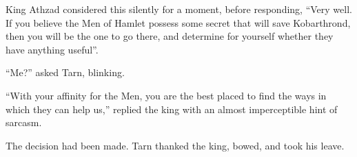 King Athzad considered this silently for a moment, before responding, ``Very well.  If you believe the Men of Hamlet possess some secret that will save Kobarthrond, then you will be the one to go there, and determine for yourself whether they have anything useful''.

``Me?'' asked Tarn, blinking.

``With your affinity for the Men, you are the best placed to find the ways in which they can help us,'' replied the king with an almost imperceptible hint of sarcasm.

The decision had been made.  Tarn thanked the king, bowed, and took his leave.